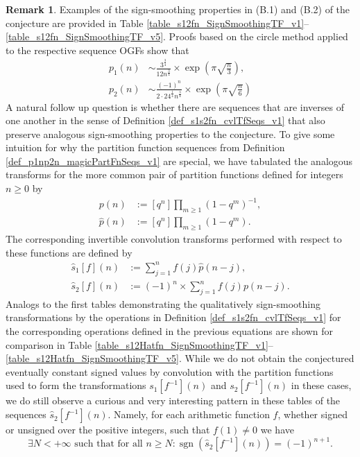 \documentclass[12pt,reqno,a4letter]{article}
\numberwithin{figure}{section}
\numberwithin{table}{section}
\numberwithin{equation}{section}
\newcommand{\seqnum}[1]{\href{http://oeis.org/#1}{\color{ProcessBlue}{\underline{#1}}}}
\theoremstyle{plain}
\numberwithin{theorem}{section}
\theoremstyle{definition}
\newtheorem{remark}[theorem]{Remark}
\begin{document}
\begin{remark}
Examples of the sign-smoothing properties in (B.1) and (B.2) of the conjecture are provided in 
Table \ref{table_s12fn_SignSmoothingTF_v1}--\ref{table_s12fn_SignSmoothingTF_v5}. 
Proofs based on the circle method applied to the respective sequence OGFs show that 
\cite{ACOMB-BOOK}
\begin{align*}
p_1(n) & \sim \frac{3^{\frac{3}{4}}}{12 n^{\frac{3}{4}}} \times \exp\left(\pi\sqrt{\frac{n}{3}}\right), \\ 
p_2(n) & \sim \frac{(-1)^n}{2 \cdot 24^{\frac{1}{4}} n^{\frac{3}{4}}} \times \exp\left(\pi\sqrt{\frac{n}{6}}\right)
\end{align*}
A natural follow up question is whether there are sequences that are inverses of one another in the 
sense of Definition \ref{def_s1s2fn_cvlTfSeqs_v1} that also preserve 
analogous sign-smoothing properties to the conjecture. 
To give some intuition for why the partition function sequences from 
Definition \ref{def_p1np2n_magicPartFnSeqs_v1} are special, we have 
tabulated the analogous transforms for the more common pair of partition functions 
defined for integers $n \geq 0$ by 
\cite[\seqnum{A000041}; \seqnum{A010815}]{OEIS} 
\begin{align*}
p(n) & := [q^n] \prod_{m \geq 1} (1-q^m)^{-1}, \\ 
\hat{p}(n) & := [q^n] \prod_{m \geq 1} (1-q^m). 
\end{align*}
The corresponding invertible convolution transforms performed with respect to these functions 
are defined by 
\begin{align*} 
\widehat{s}_1[f](n) & := \sum_{j=1}^{n} f(j) \hat{p}(n-j), \\ 
\widehat{s}_2[f](n) & := (-1)^n \times \sum_{j=1}^{n} f(j) p(n-j). 
\end{align*}
Analogs to the first tables demonstrating the qualitatively sign-smoothing transformations 
by the operations in Definition \ref{def_s1s2fn_cvlTfSeqs_v1} for the corresponding 
operations defined in the previous equations are shown for comparison in 
Table \ref{table_s12Hatfn_SignSmoothingTF_v1}--\ref{table_s12Hatfn_SignSmoothingTF_v5}.
While we do not obtain the conjectured eventually constant signed values by 
convolution with the partition functions used to form the transformations 
$s_1[f^{-1}](n)$ and $s_2[f^{-1}](n)$ in these cases, we do still observe a curious and very 
interesting pattern in these tables of the sequences $\widehat{s}_2[f^{-1}](n)$. 
Namely, for each arithmetic function $f$, 
whether signed or unsigned over the positive integers, such that $f(1) \neq 0$ we have 
\[
	\exists N < +\infty \text{ such that for all } n \geq N:
	\operatorname{sgn}\left(\widehat{s}_2\left[f^{-1}\right](n)\right) = (-1)^{n+1}. 
\]
\end{remark}
\end{document}
